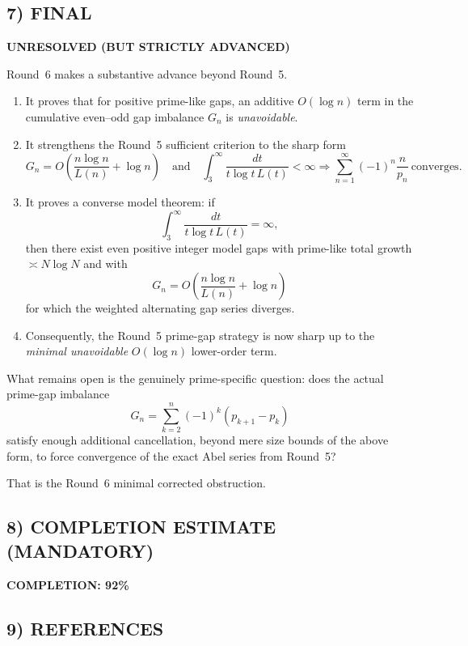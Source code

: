 \subsection*{7) FINAL}

\textbf{UNRESOLVED (BUT STRICTLY ADVANCED)}

Round~6 makes a substantive advance beyond Round~5.

\begin{enumerate}
\item It proves that for positive prime-like gaps, an additive \(O(\log n)\) term in the cumulative even--odd gap imbalance \(G_n\) is \emph{unavoidable}.

\item It strengthens the Round~5 sufficient criterion to the sharp form
\[
G_n=O\!\left(\frac{n\log n}{L(n)}+\log n\right)
\quad\text{and}\quad
\int_3^\infty \frac{dt}{t\log t\,L(t)}<\infty
\Longrightarrow
\sum_{n=1}^\infty (-1)^n\frac{n}{p_n}\ \text{converges}.
\]

\item It proves a converse model theorem:
if
\[
\int_3^\infty \frac{dt}{t\log t\,L(t)}=\infty,
\]
then there exist even positive integer model gaps with prime-like total growth \(\asymp N\log N\) and with
\[
G_n=O\!\left(\frac{n\log n}{L(n)}+\log n\right)
\]
for which the weighted alternating gap series diverges.

\item Consequently, the Round~5 prime-gap strategy is now sharp up to the \emph{minimal unavoidable} \(O(\log n)\) lower-order term.
\end{enumerate}

What remains open is the genuinely prime-specific question:
does the actual prime-gap imbalance
\[
G_n=\sum_{k=2}^n (-1)^k (p_{k+1}-p_k)
\]
satisfy enough additional cancellation, beyond mere size bounds of the above form, to force convergence of the exact Abel series from Round~5?

That is the Round~6 minimal corrected obstruction.

\subsection*{8) COMPLETION ESTIMATE (MANDATORY)}

\textbf{COMPLETION: 92\%}

\subsection*{9) REFERENCES}

